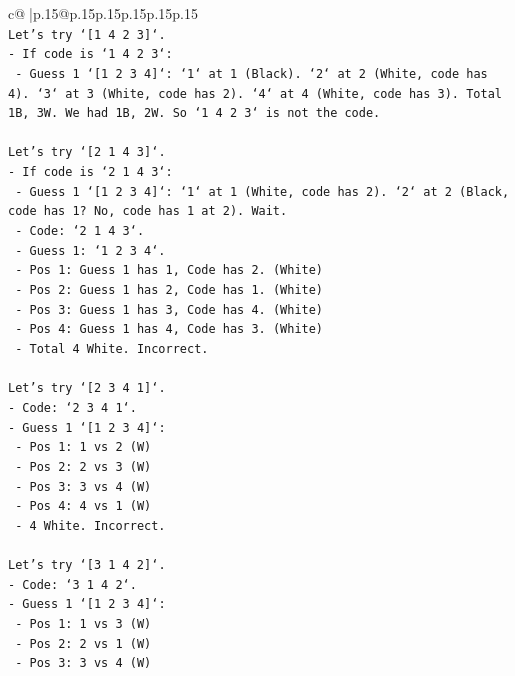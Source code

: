 \documentclass{article}
\begin{document}
{\begin{supertabular}{c@{$\;$}|p{.15\linewidth}@{}p{.15\linewidth}p{.15\linewidth}p{.15\linewidth}p{.15\linewidth}p{.15\linewidth}}
{{{\\ 
\texttt{Let's try `{[}1 4 2 3{]}`.} \\
\texttt{{-} If code is `1 4 2 3`:} \\
\texttt{    {-} Guess 1 `{[}1 2 3 4{]}`: `1` at 1 (Black). `2` at 2 (White, code has 4). `3` at 3 (White, code has 2). `4` at 4 (White, code has 3). Total 1B, 3W. We had 1B, 2W. So `1 4 2 3` is not the code.} \\
\\ 
\texttt{Let's try `{[}2 1 4 3{]}`.} \\
\texttt{{-} If code is `2 1 4 3`:} \\
\texttt{    {-} Guess 1 `{[}1 2 3 4{]}`: `1` at 1 (White, code has 2). `2` at 2 (Black, code has 1? No, code has 1 at 2). Wait.} \\
\texttt{    {-} Code: `2 1 4 3`.} \\
\texttt{    {-} Guess 1: `1 2 3 4`.} \\
\texttt{        {-} Pos 1: Guess 1 has 1, Code has 2. (White)} \\
\texttt{        {-} Pos 2: Guess 1 has 2, Code has 1. (White)} \\
\texttt{        {-} Pos 3: Guess 1 has 3, Code has 4. (White)} \\
\texttt{        {-} Pos 4: Guess 1 has 4, Code has 3. (White)} \\
\texttt{        {-} Total 4 White. Incorrect.} \\
\\ 
\texttt{Let's try `{[}2 3 4 1{]}`.} \\
\texttt{{-} Code: `2 3 4 1`.} \\
\texttt{{-} Guess 1 `{[}1 2 3 4{]}`:} \\
\texttt{    {-} Pos 1: 1 vs 2 (W)} \\
\texttt{    {-} Pos 2: 2 vs 3 (W)} \\
\texttt{    {-} Pos 3: 3 vs 4 (W)} \\
\texttt{    {-} Pos 4: 4 vs 1 (W)} \\
\texttt{    {-} 4 White. Incorrect.} \\
\\ 
\texttt{Let's try `{[}3 1 4 2{]}`.} \\
\texttt{{-} Code: `3 1 4 2`.} \\
\texttt{{-} Guess 1 `{[}1 2 3 4{]}`:} \\
\texttt{    {-} Pos 1: 1 vs 3 (W)} \\
\texttt{    {-} Pos 2: 2 vs 1 (W)} \\
\texttt{    {-} Pos 3: 3 vs 4 (W)} \\
}}}
\end{supertabular}}
\end{document}
